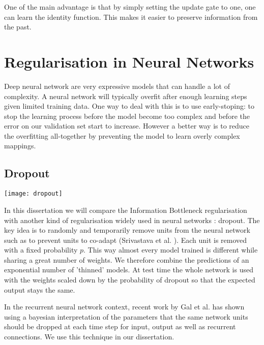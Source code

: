 \documentclass[11pt,oneside,openright]{report}
\begin{document}
One of the main advantage is that by simply setting the update gate to one, one can learn the identity function. This makes it easier to preserve information from the past.


\section{Regularisation in Neural Networks}
Deep neural network are very expressive models that can handle a lot of complexity. A neural network will typically overfit after enough learning steps given limited training data. One way to deal with this is to use early-stoping: to stop the learning process before the model become too complex and before the error on our validation set start to increase. However a better way is to reduce the overfitting all-together by preventing the model to learn overly complex mappings.

\subsection{Dropout}

\begin{center}
\texttt{[image: dropout]}
\end{center}

In this dissertation we will compare the Information Bottleneck regularisation with another kind of regularisation widely used in neural networks : dropout. The key idea is to randomly and temporarily remove units from the neural network such as to prevent units to co-adapt (Srivastava et al. \cite{dropout}). Each unit is removed with a fixed probability $p$. This way almost every model trained is different while sharing a great number of weights. We therefore combine the predictions of an exponential number of 'thinned' models. At test time the whole network is used with the weights scaled down by the probability of dropout so that the expected output stays the same.

In the recurrent neural network context, recent work by Gal et al. \cite{gal} has shown using a bayesian interpretation of the parameters that the same network units should be dropped at each time step for input, output as well as recurrent connections. We use this technique in our dissertation.
\end{document}
